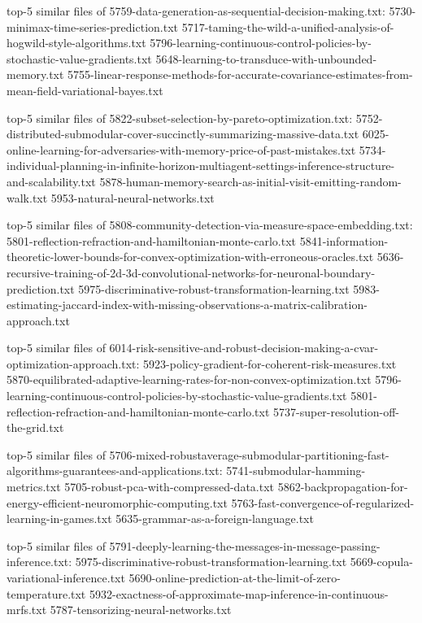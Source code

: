 \documentclass[11pt]{article}
\begin{document}
top-5 similar files of
5759-data-generation-as-sequential-decision-making.txt:
5730-minimax-time-series-prediction.txt
5717-taming-the-wild-a-unified-analysis-of-hogwild-style-algorithms.txt
5796-learning-continuous-control-policies-by-stochastic-value-gradients.txt
5648-learning-to-transduce-with-unbounded-memory.txt
5755-linear-response-methods-for-accurate-covariance-estimates-from-mean-field-variational-bayes.txt

top-5 similar files of 5822-subset-selection-by-pareto-optimization.txt:
5752-distributed-submodular-cover-succinctly-summarizing-massive-data.txt
6025-online-learning-for-adversaries-with-memory-price-of-past-mistakes.txt
5734-individual-planning-in-infinite-horizon-multiagent-settings-inference-structure-and-scalability.txt
5878-human-memory-search-as-initial-visit-emitting-random-walk.txt
5953-natural-neural-networks.txt

top-5 similar files of
5808-community-detection-via-measure-space-embedding.txt:
5801-reflection-refraction-and-hamiltonian-monte-carlo.txt
5841-information-theoretic-lower-bounds-for-convex-optimization-with-erroneous-oracles.txt
5636-recursive-training-of-2d-3d-convolutional-networks-for-neuronal-boundary-prediction.txt
5975-discriminative-robust-transformation-learning.txt
5983-estimating-jaccard-index-with-missing-observations-a-matrix-calibration-approach.txt

top-5 similar files of
6014-risk-sensitive-and-robust-decision-making-a-cvar-optimization-approach.txt:
5923-policy-gradient-for-coherent-risk-measures.txt
5870-equilibrated-adaptive-learning-rates-for-non-convex-optimization.txt
5796-learning-continuous-control-policies-by-stochastic-value-gradients.txt
5801-reflection-refraction-and-hamiltonian-monte-carlo.txt
5737-super-resolution-off-the-grid.txt

top-5 similar files of
5706-mixed-robustaverage-submodular-partitioning-fast-algorithms-guarantees-and-applications.txt:
5741-submodular-hamming-metrics.txt
5705-robust-pca-with-compressed-data.txt
5862-backpropagation-for-energy-efficient-neuromorphic-computing.txt
5763-fast-convergence-of-regularized-learning-in-games.txt
5635-grammar-as-a-foreign-language.txt

top-5 similar files of
5791-deeply-learning-the-messages-in-message-passing-inference.txt:
5975-discriminative-robust-transformation-learning.txt
5669-copula-variational-inference.txt
5690-online-prediction-at-the-limit-of-zero-temperature.txt
5932-exactness-of-approximate-map-inference-in-continuous-mrfs.txt
5787-tensorizing-neural-networks.txt
\end{document}
